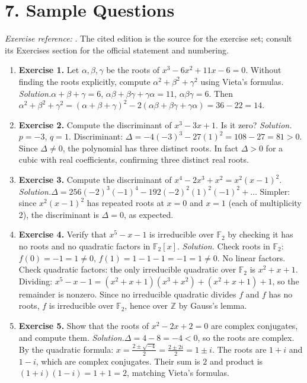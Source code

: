 \section*{7. Sample Questions}
\emph{Exercise reference:} \cite{equations_ref1}. The cited edition is the source for the exercise set; consult its Exercises section for the official statement and numbering.
\begin{enumerate}[leftmargin=*,itemsep=0.9em]
\item \textbf{Exercise 1.} Let $\alpha, \beta, \gamma$ be the roots of $x^3 - 6x^2 + 11x - 6 = 0$. Without finding the roots explicitly, compute $\alpha^2 + \beta^2 + \gamma^2$ using Vieta's formulas. \emph{Solution.}$\alpha + \beta + \gamma = 6$, $\alpha\beta + \beta\gamma + \gamma\alpha = 11$, $\alpha\beta\gamma = 6$. Then $\alpha^2 + \beta^2 + \gamma^2 = (\alpha + \beta + \gamma)^2 - 2(\alpha\beta + \beta\gamma + \gamma\alpha) = 36 - 22 = 14$.

\item \textbf{Exercise 2.} Compute the discriminant of $x^3 - 3x + 1$. Is it zero? \emph{Solution.}$p = -3$, $q = 1$. Discriminant: $\Delta = -4(-3)^3 - 27(1)^2 = 108 - 27 = 81 > 0$. Since $\Delta \neq 0$, the polynomial has three distinct roots. In fact $\Delta > 0$ for a cubic with real coefficients, confirming three distinct real roots.

\item \textbf{Exercise 3.} Compute the discriminant of $x^4 - 2x^3 + x^2 = x^2(x-1)^2$. \emph{Solution.}$\Delta = 256(-2)^3(-1)^4 - 192(-2)^2(1)^2(-1)^2 + \ldots$ Simpler: since $x^2(x-1)^2$ has repeated roots at $x=0$ and $x=1$ (each of multiplicity 2), the discriminant is $\Delta = 0$, as expected.

\item \textbf{Exercise 4.} Verify that $x^5 - x - 1$ is irreducible over $\mathbb{F}_2$ by checking it has no roots and no quadratic factors in $\mathbb{F}_2[x]$. \emph{Solution.} Check roots in $\mathbb{F}_2$: $f(0) = -1 = 1 \neq 0$, $f(1) = 1 - 1 - 1 = -1 = 1 \neq 0$. No linear factors. Check quadratic factors: the only irreducible quadratic over $\mathbb{F}_2$ is $x^2 + x + 1$. Dividing: $x^5 - x - 1 = (x^2 + x + 1)(x^3 + x^2) + (x^2 + x + 1) + 1$, so the remainder is nonzero. Since no irreducible quadratic divides $f$ and $f$ has no roots, $f$ is irreducible over $\mathbb{F}_2$, hence over $\mathbb{Z}$ by Gauss's lemma.

\item \textbf{Exercise 5.} Show that the roots of $x^2 - 2x + 2 = 0$ are complex conjugates, and compute them. \emph{Solution.}$\Delta = 4 - 8 = -4 < 0$, so the roots are complex. By the quadratic formula: $x = \frac{2 \pm \sqrt{-4}}{2} = \frac{2 \pm 2i}{2} = 1 \pm i$. The roots are $1 + i$ and $1 - i$, which are complex conjugates. Their sum is $2$ and product is $(1+i)(1-i) = 1 + 1 = 2$, matching Vieta's formulas.

\end{enumerate}
